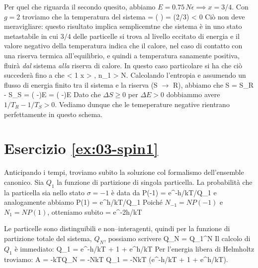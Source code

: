 Per quel che riguarda il secondo quesito, abbiamo $E=0.75\,N\epsilon \implies x = 3/4$. Con $g=2$ troviamo che la temperatura del sistema
\be
  \beta\epsilon = \ln\left(  \right) = \ln(2/3)  < 0
\ee
	Ciò non deve meravigliare: questo risultato implica semplicemtne che sistema è in uno stato metastabile in cui $3/4$ delle particelle si trova al livello eccitato di energia e il valore negativo della temperatura indica che il calore, nel caso di contatto con una riserva termica all'equilibrio, e quindi a temperatura sanamente positiva, fluirà \emph{dal} sistema \emph{alla} riserva di calore. In questo caso particolare si ha che ciò succederà fino a che 
\be
	 < 1 \implies x > , \quad {} \quad n_1 > N.
\ee 
	 Calcolando l'entropia e assumendo un flusso di energia finito tra il sistema e la riserva (S $\rightarrow$ R), abbiamo che
\be
	\Delta S = \Delta S_R - \Delta S_S = \left( -\right)\Delta E = \left( -\right)\Delta E
\ee
	Dato che $\Delta S \ge 0$ per $\Delta E >0$ dobbiammo avere $1/T_R - 1/T_S > 0$. Vediamo dunque che le temeperature negative rientrano perfettamente in questo schema.

\section*{Esercizio \ref{ex:03-spin1}}

Anticipando i tempi, troviamo subito la soluzione col formalismo dell'ensemble canonico. Sia $Q_1$ la funzione di partizione di singola particella. La probabilità che la particella sia nello stato $\sigma = -1$ è data da
\be
P(-1) = e^{-h/kT}/Q_1
\ee
e analogamente abbiamo
\be
P(1) = e^{h/kT}/Q_1
\ee
Poiché $N_{-1} = NP(-1)$ e $N_{1} = NP(1)$, otteniamo subito
\be
\label{exeq:ratiocan}
 = e^{-2h/kT}
\ee

Le particelle sono distinguibili e non--interagenti, quindi per la funzione di partizione totale del sistema, $Q_N$, possiamo scrivere
\be
Q_N = Q_1^N
\ee
Il calcolo di $Q_1$ è immediato:
\be
Q_1 = e^{-h/kT} + 1 + e^{h/kT}
\ee
Per l'energia libera di Helmholtz troviamo:
\be
A = -kT\ln Q_N = -NkT \ln Q_1 = -NkT \ln\left(e^{-h/kT} + 1 + e^{h/kT}\right).
\ee

